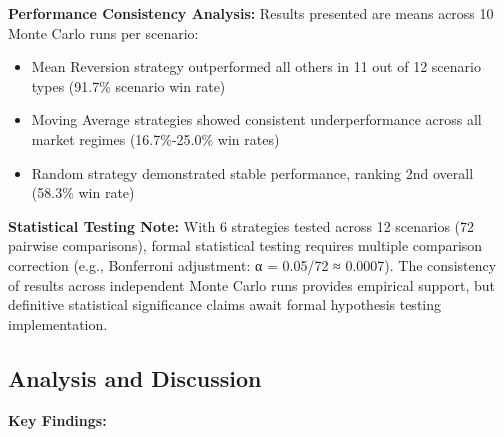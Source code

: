 \documentclass[11pt,a4paper]{article}
\begin{document}
\textbf{Performance Consistency Analysis:}
Results presented are means across 10 Monte Carlo runs per scenario:
\begin{itemize}
\item Mean Reversion strategy outperformed all others in 11 out of 12 scenario types (91.7\% scenario win rate)
\item Moving Average strategies showed consistent underperformance across all market regimes (16.7\%-25.0\% win rates)
\item Random strategy demonstrated stable performance, ranking 2nd overall (58.3\% win rate)

\end{itemize}
\textbf{Statistical Testing Note:} With 6 strategies tested across 12 scenarios (72 pairwise comparisons), formal statistical testing requires multiple comparison correction (e.g., Bonferroni adjustment: α = 0.05/72 ≈ 0.0007). The consistency of results across independent Monte Carlo runs provides empirical support, but definitive statistical significance claims await formal hypothesis testing implementation.

\subsection{Analysis and Discussion}

\textbf{Key Findings:}
\end{document}
